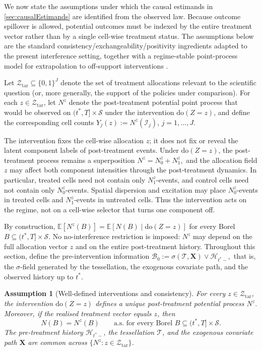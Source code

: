 \documentclass{statsoc}
\newtheorem{assumption}[assumption]{Assumption}
\newcommand{\bbE}{\mathbb{E}}
\newcommand{\1}{\mathbbm{1}}
\newcommand{\CovX}{\mathbf{X}}
\newcommand{\Fobs}{\mathcal H}
\newcommand{\Nproc}{N}
\newcommand{\Nzero}{N_0}
\newcommand{\None}{N_1}
\begin{document}
We now state the assumptions under which the causal estimands in \cref{sec:causalEstimands} are identified from the observed law. Because outcome spillover is allowed, potential outcomes must be indexed by the entire treatment vector rather than by a single cell-wise treatment status. The assumptions below are the standard consistency/exchangeability/positivity ingredients adapted to the present interference setting, together with a regime-stable point-process model for extrapolation to off-support interventions \citep{pearl2009causal,robins1992identifiability}.

Let \(\mathcal Z_{\mathrm{tar}}\subseteq \{0,1\}^J\) denote the set of treatment allocations relevant to the scientific question (or, more generally, the support of the policies under comparison). For each \(z\in\mathcal Z_{\mathrm{tar}}\), let \(\Nproc^z\) denote the post-treatment potential point process that would be observed on \((t^\ast,T]\times\mathcal S\) under the intervention \(\mathrm{do}(Z=z)\), and define the corresponding cell counts \(Y_j(z):=\Nproc^z(\mathcal I_j)\), \(j=1,\ldots,J\).

The intervention fixes the cell-wise allocation \(z\); it does not fix or reveal the latent component labels of post-treatment events. Under \(\mathrm{do}(Z=z)\), the post-treatment process remains a superposition
\(
\Nproc^z=\Nzero^z+\None^z,
\)
and the allocation field \(z\) may affect both component intensities through the post-treatment dynamics. In particular, treated cells need not contain only \(\None^z\)-events, and control cells need not contain only \(\Nzero^z\)-events. Spatial dispersion and excitation may place \(\Nzero^z\)-events in treated cells and \(\None^z\)-events in untreated cells. Thus the intervention acts on the regime, not on a cell-wise selector that turns one component off.

By construction, \(\bbE[\Nproc^z(B)] = \bbE[\Nproc(B)\mid \mathrm{do}(Z=z)]\) for every Borel \(B\subseteq (t^\ast,T]\times\mathcal S\). No no-interference restriction is imposed: \(\Nproc^z\) may depend on the full allocation vector \(z\) and on the entire post-treatment history. Throughout this section, define the pre-intervention information
\(
\mathcal B_0:=\sigma(\mathcal T,\CovX)\vee \Fobs_{t^\ast-},
\)
that is, the \(\sigma\)-field generated by the tessellation, the exogenous covariate path, and the observed history up to \(t^\ast\).

\begin{assumption}[Well-defined interventions and consistency]\label{ass:id-consistency}
For every \(z\in\mathcal Z_{\mathrm{tar}}\), the intervention \(\mathrm{do}(Z=z)\) defines a unique post-treatment potential process \(\Nproc^z\). Moreover, if the realised treatment vector equals \(z\), then
\[
\Nproc(B)=\Nproc^z(B)\qquad\text{a.s. for every Borel }B\subseteq (t^\ast,T]\times\mathcal S.
\]
The pre-treatment history \(\Fobs_{t^\ast-}\), the tessellation \(\mathcal T\), and the exogenous covariate path \(\CovX\) are common across \(\{\Nproc^z:z\in\mathcal Z_{\mathrm{tar}}\}\).
\end{assumption}
\end{document}
